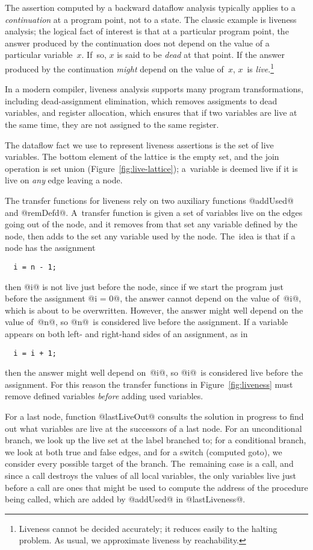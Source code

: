 \documentclass[blockstyle,preprint,nocopyrightspace]{sigplanconf}
\newcommand\figref[1]{Figure~\ref{fig:#1}}
\begin{document}
The assertion computed by 
a backward dataflow analysis typically applies to a
\emph{continuation} at a program point, not to a state.
The classic example is liveness analysis;
the logical fact of interest is that at a particular program point,
the answer produced by the continuation does not depend on
the value of a particular variable~$x$.
If~so, $x$ is said to be \emph{dead} at that point.
If the answer produced by the continuation \emph{might} depend on the
value of~$x$, $x$~is \emph{live}.\footnote
{Liveness cannot be decided accurately; it reduces easily to the halting problem.
As usual, we approximate liveness by reachability.}

In a modern compiler, liveness analysis supports many program
transformations,
including
dead-assignment elimination,
which removes assigments to dead variables, 
and register allocation, which
ensures that if two variables are 
live at the same time, they are not assigned to the same register. 

The dataflow fact we use to represent liveness assertions is the set of
live variables.
The bottom element of the lattice is the empty set, and the join
operation is set union (\figref{live-lattice});
a~variable is deemed live if it is live on \emph{any} edge leaving a
node.

The transfer functions for liveness rely on two auxiliary functions
@addUsed@ and @remDefd@.
A~transfer function is given a set of variables live on the edges
going out of the node, and it removes from that set any variable
defined by the node, then adds to the set any variable used by the
node.
The~idea is that if a node has the assignment
\begin{verbatim}
  i = n - 1;
\end{verbatim}
then @i@ is not live just before the node, since if we start the
program just before the assignment @i = 0@, the answer cannot 
depend on the value of~@i@, which is about to be overwritten.
However, the answer might well depend on the value of~@n@, so
@n@~is considered live before the assignment.
If a variable appears on both left- and right-hand sides of an
assignment, as in
\begin{verbatim}
  i = i + 1;
\end{verbatim}
then the answer might well depend on~@i@, so @i@~is considered live
before the assignment.
For this reason the transfer functions in \figref{liveness} must
remove defined variables \emph{before} adding used variables.

For a last node, function @lastLiveOut@ consults the solution in
progress to find out what variables are live at the successors of a
last node. 
For an unconditional branch, we look up the live set at the label
branched to;
for a conditional branch, we look at both true and false edges, and
for a switch (computed goto), we consider every possible target of the
branch.
The~remaining case is a call, 
and since a call destroys the values of all local variables, the
only variables live just before a call are ones that might be used to
compute the address of the procedure being called, which are added by
@addUsed@ in @lastLiveness@.
\end{document}
